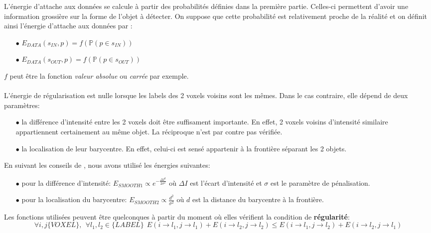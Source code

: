 \documentclass{article}
\begin{document}
L'énergie d'attache aux données se calcule à partir des probabilités définies dans la première partie. Celles-ci permettent d'avoir une information grossière sur la forme de l'objet à détecter. On suppose que cette probabilité est relativement proche de la réalité et on définit ainsi l'énergie d'attache aux données par :
\begin{center}
\begin{itemize}
	\item[$\bullet$] $E_{DATA}(s_{IN}, p) = f(\mathbb{P}(p \in s_{IN}))$
	\item[$\bullet$] $E_{DATA}(s_{OUT}, p) =f( \mathbb{P}(p \in s_{OUT}))$
\end{itemize}
\end{center}
$f$ peut être la fonction \textit{valeur absolue} ou \textit{carrée} par exemple.
\\
\\
L'énergie de régularisation est nulle lorsque les labels des 2 voxels voisins sont les mêmes. Dans le cas contraire, elle dépend de deux paramètres:
\begin{itemize}
	\item[$\bullet$] la différence d'intensité entre les 2 voxels doit être suffisament importante. En effet, 2 voxels voisins d'intensité similaire appartiennent certainement au même objet. La réciproque n'est par contre pas vérifiée.
	\item[$\bullet$] la localisation de leur barycentre. En effet, celui-ci est sensé appartenir à la frontière séparant les 2 objets.
\end{itemize}
En suivant les conseils de \cite{bib:seg}, nous avons utilisé les énergies suivantes:
\begin{itemize}
	\item[$\bullet$] pour la différence d'intensité: $E_{SMOOTH 1} \varpropto e^{-\frac{\Delta I^2}{2\sigma^2}}$ où $\Delta I$ est l'écart d'intensité et $\sigma$ est le paramètre de pénalisation.
	\item[$\bullet$] pour la localisation du barycentre: $E_{SMOOTH 2} \varpropto  \frac{d^2}{\sigma^2}$ où $d$ est la distance du barycentre à la frontière.
\end{itemize}
Les fonctions utilisées peuvent être quelconques à partir du moment où elles vérifient la condition de \textbf{régularité}:
\begin{equation*}
\forall i, j \{VOXEL\}, \ \ \forall l_1, l_2 \in \{LABEL\}\ \  E(i\rightarrow l_1, j\rightarrow l_1) + E(i\rightarrow l_2, j\rightarrow l_2) \leq E(i\rightarrow l_1, j\rightarrow l_2) + E(i\rightarrow l_2, j\rightarrow l_1)
\end{equation*}
\end{document}
